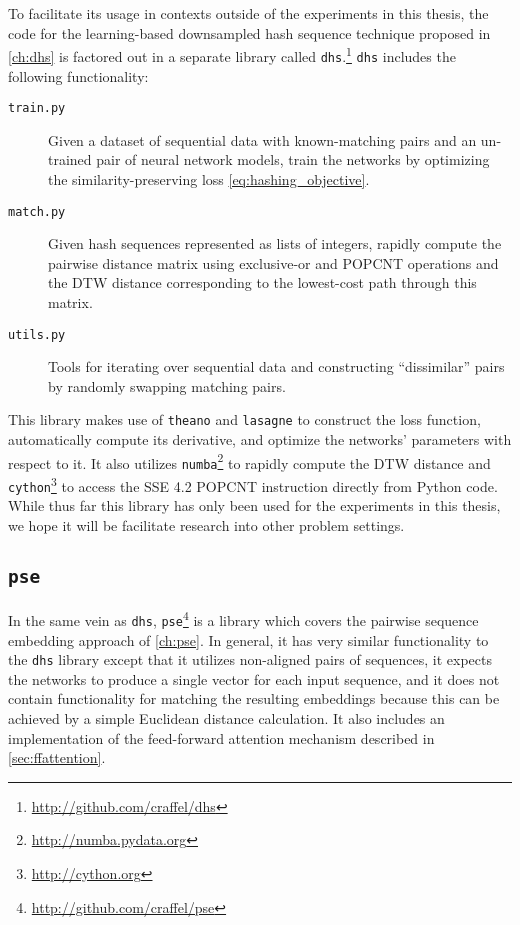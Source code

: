 To facilitate its usage in contexts outside of the experiments in this thesis, the code for the learning-based downsampled hash sequence technique proposed in \cref{ch:dhs} is factored out in a separate library called \texttt{dhs}.\footnote{\url{http://github.com/craffel/dhs}}
\texttt{dhs} includes the following functionality:
\begin{description}
\item[\texttt{train.py}] Given a dataset of sequential data with known-matching pairs and an un-trained pair of neural network models, train the networks by optimizing the similarity-preserving loss \cref{eq:hashing_objective}.
\item[\texttt{match.py}] Given hash sequences represented as lists of integers, rapidly compute the pairwise distance matrix using exclusive-or and POPCNT operations and the DTW distance corresponding to the lowest-cost path through this matrix.
\item[\texttt{utils.py}] Tools for iterating over sequential data and constructing ``dissimilar'' pairs by randomly swapping matching pairs.
\end{description}
This library makes use of \texttt{theano} \cite{bergstra2010theano,bastien2012theano,al-rfou2016theano} and \texttt{lasagne} \cite{dieleman2015lasagne} to construct the loss function, automatically compute its derivative, and optimize the networks' parameters with respect to it.
It also utilizes \texttt{numba}\footnote{\url{http://numba.pydata.org}} to rapidly compute the DTW distance and \texttt{cython}\footnote{\url{http://cython.org}} to access the SSE 4.2 POPCNT instruction directly from Python code.
While thus far this library has only been used for the experiments in this thesis, we hope it will be facilitate research into other problem settings.

\subsection{\texttt{pse}}

In the same vein as \texttt{dhs}, \texttt{pse}\footnote{\url{http://github.com/craffel/pse}} is a library which covers the pairwise sequence embedding approach of \cref{ch:pse}.
In general, it has very similar functionality to the \texttt{dhs} library except that it utilizes non-aligned pairs of sequences, it expects the networks to produce a single vector for each input sequence, and it does not contain functionality for matching the resulting embeddings because this can be achieved by a simple Euclidean distance calculation.
It also includes an implementation of the feed-forward attention mechanism described in \cref{sec:ffattention}.

